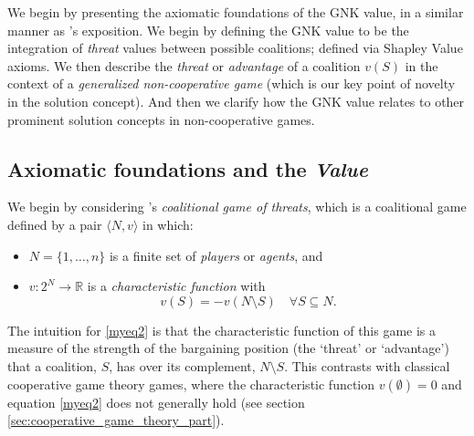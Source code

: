 We begin by presenting the axiomatic foundations of the GNK value, in a similar manner as \cite{value2}'s exposition.
We begin by defining the GNK value to be the integration of \emph{threat} values between possible coalitions; defined via Shapley Value axioms.
We then describe the \emph{threat} or \emph{advantage} of a coalition $v(S)$ in the context of a \textit{generalized non-cooperative game} (which is our key point of novelty in the solution concept).
And then we clarify how the GNK value relates to other prominent solution concepts in non-cooperative games.

\subsection{Axiomatic foundations and the \textit{Value}}\label{the_value_def}


We begin by considering \cite{KOHLBERG2018139}'s \textit{coalitional game of threats}, 
which is a coalitional game defined by a pair $\langle N,v \rangle$ in which:
\begin{itemize}
\item	$N=\{1,\dots,n\}$ is a finite set of \textit{players} or \textit{agents}, and
\item	$v:2^N\rightarrow \mathbb{R}$ is a \textit{characteristic function} with 
\begin{equation}
v(S)=-v(N\setminus S) \label{myeq2} \quad \forall S\subseteq N.
\end{equation}
\end{itemize}
The intuition for \eqref{myeq2} is that the characteristic function of this game is a measure of the strength of the bargaining position (the `threat' or `advantage') that a coalition, $S$, has over its complement, $N\setminus S$.
This contrasts with classical cooperative game theory games, where the characteristic function $v(\emptyset)=0$ and equation \ref{myeq2} does not generally hold (see section \ref{sec:cooperative_game_theory_part}).

